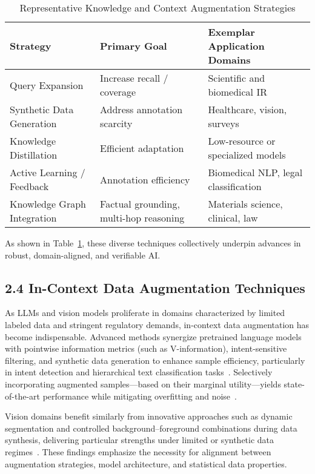 \documentclass[11pt]{article}
\begin{document}
\begin{table}[ht]
\centering
\caption{Representative Knowledge and Context Augmentation Strategies}
\label{tab:augmentation_strategies}
\begin{tabular}{l l l}
\hline
\textbf{Strategy} & \textbf{Primary Goal} & \textbf{Exemplar Application Domains} \\
\hline
Query Expansion         & Increase recall / coverage   & Scientific and biomedical IR \\
Synthetic Data Generation & Address annotation scarcity & Healthcare, vision, surveys \\
Knowledge Distillation  & Efficient adaptation        & Low-resource or specialized models \\
Active Learning / Feedback & Annotation efficiency        & Biomedical NLP, legal classification \\
Knowledge Graph Integration & Factual grounding, multi-hop reasoning & Materials science, clinical, law \\
\hline
\end{tabular}
\end{table}

As shown in Table~\ref{tab:augmentation_strategies}, these diverse techniques collectively underpin advances in robust, domain-aligned, and verifiable AI.

\subsection{2.4 In-Context Data Augmentation Techniques}

As LLMs and vision models proliferate in domains characterized by limited labeled data and stringent regulatory demands, in-context data augmentation has become indispensable. Advanced methods synergize pretrained language models with pointwise information metrics (such as V-information), intent-sensitive filtering, and synthetic data generation to enhance sample efficiency, particularly in intent detection and hierarchical text classification tasks~\cite{ref61}. Selectively incorporating augmented samples—based on their marginal utility—yields state-of-the-art performance while mitigating overfitting and noise~\cite{ref61}.

Vision domains benefit similarly from innovative approaches such as dynamic segmentation and controlled background–foreground combinations during data synthesis, delivering particular strengths under limited or synthetic data regimes~\cite{ref62}. These findings emphasize the necessity for alignment between augmentation strategies, model architecture, and statistical data properties.
\end{document}
